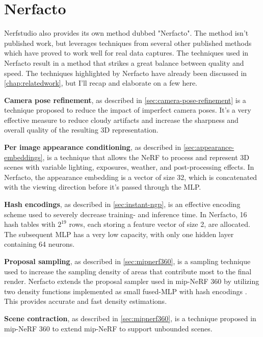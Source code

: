 \section{Nerfacto} \label{sec:nerfacto}
Nerfstudio also provides its own method dubbed "Nerfacto". The method isn't published work, but leverages techniques from several other published methods which have proved to work well for real data captures. The techniques used in Nerfacto result in a method that strikes a great balance between quality and speed. The techniques highlighted by Nerfacto have already been discussed in \autoref{chap:relatedwork}, but I'll recap and elaborate on a few here.



\textbf{Camera pose refinement}, as described in \autoref{sec:camera-pose-refinement} is a technique proposed to reduce the impact of imperfect camera poses. It's a very effective measure to reduce cloudy artifacts and increase the sharpness and overall quality of the resulting 3D representation.

\textbf{Per image appearance conditioning}, as described in \autoref{sec:appearance-embeddings}, is a technique that allows the NeRF to process and represent 3D scenes with variable lighting, exposures, weather, and post-processing effects. In Nerfacto, the appearance embedding is a vector of size 32, which is concatenated with the viewing direction before it's passed through the MLP.

\textbf{Hash encodings}, as described in \autoref{sec:instant-ngp}, is an effective encoding scheme used to severely decrease training- and inference time. In Nerfacto, 16 hash tables with $2^{19}$ rows, each storing a feature vector of size 2, are allocated. The subsequent MLP has a very low capacity, with only one hidden layer containing 64 neurons.

\textbf{Proposal sampling}, as described in \autoref{sec:mipnerf360}, is a sampling technique used to increase the sampling density of areas that contribute most to the final render. Nerfacto extends the proposal sampler used in mip-NeRF 360 \cite{barron_mip-nerf_2022} by utilizing two density functions implemented as small fused-MLP with hash encodings \cite{muller_instant_2022}. This provides accurate and fast density estimations.

\textbf{Scene contraction}, as described in \autoref{sec:mipnerf360}, is a technique proposed in mip-NeRF 360 \cite{barron_mip-nerf_2022} to extend mip-NeRF to support unbounded scenes.